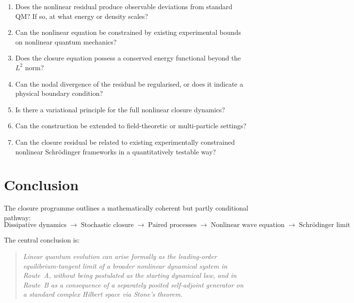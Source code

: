 \documentclass[12pt]{article}
\begin{document}
\begin{enumerate}
    \item Does the nonlinear residual produce observable deviations from standard QM? If so, at what energy or density scales?
    \item Can the nonlinear equation be constrained by existing experimental bounds on nonlinear quantum mechanics?
    \item Does the closure equation possess a conserved energy functional beyond the $L^2$ norm?
    \item Can the nodal divergence of the residual be regularised, or does it indicate a physical boundary condition?
    \item Is there a variational principle for the full nonlinear closure dynamics?
    \item Can the construction be extended to field-theoretic or multi-particle settings?
    \item Can the closure residual be related to existing experimentally constrained nonlinear Schr\"odinger frameworks in a quantitatively testable way?
\end{enumerate}

\section{Conclusion}\label{sec:conclusion}

The closure programme outlines a mathematically coherent but partly conditional pathway:
\begin{equation*}
    \text{Dissipative dynamics} \;\rightarrow\; \text{Stochastic closure} \;\rightarrow\; \text{Paired processes} \;\rightarrow\; \text{Nonlinear wave equation} \;\rightarrow\; \text{Schr\"odinger limit}
\end{equation*}

The central conclusion is:

\begin{quote}
\textit{Linear quantum evolution can arise formally as the leading-order equilibrium-tangent limit of a broader nonlinear dynamical system in Route~A, without being postulated as the starting dynamical law, and in Route~B as a consequence of a separately posited self-adjoint generator on a standard complex Hilbert space via Stone's theorem.}
\end{quote}
\end{document}
